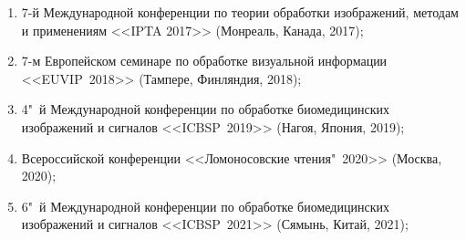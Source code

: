 \begin {enumerate}[beginpenalty=10000]
	\item 7-й Международной конференции по теории обработки изображений, методам и применениям <<IPTA 2017>> (Монреаль, Канада, 2017);
	
	\item 7-м Европейском семинаре по обработке визуальной информации <<EUVIP~2018>> (Тампере, Финляндия, 2018);
	
	\item 4"~й Международной конференции по обработке биомедицинских изображений и сигналов <<ICBSP~2019>> (Нагоя, Япония, 2019);
	
	\item Всероссийской конференции <<Ломоносовские чтения"~2020>> (Москва, 2020);
	
	\item 6"~й Международной конференции по обработке биомедицинских изображений и сигналов <<ICBSP~2021>> (Сямынь, Китай, 2021);
\end {enumerate}

